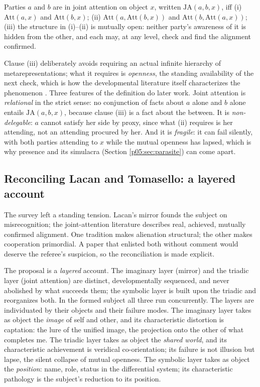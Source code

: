 \begin{defn}\label{p05:def:ja}
Parties $a$ and $b$ are in joint attention on object $x$, written $\mathrm{JA}(a,b,x)$, iff
(i) $\mathrm{Att}(a,x)$ and $\mathrm{Att}(b,x)$;
(ii) $\mathrm{Att}(a,\mathrm{Att}(b,x))$ and $\mathrm{Att}(b,\mathrm{Att}(a,x))$;
(iii) the structure in (i)--(ii) is mutually open: neither party's awareness of it is hidden from the other, and each may, at any level, check and find the alignment confirmed.
\end{defn}

Clause (iii) deliberately avoids requiring an actual infinite hierarchy of metarepresentations; what it requires is \emph{openness}, the standing availability of the next check, which is how the developmental literature itself characterizes the phenomenon \parencite{tomasello1995}. Three features of the definition do later work. Joint attention is \emph{relational} in the strict sense: no conjunction of facts about $a$ alone and $b$ alone entails $\mathrm{JA}(a,b,x)$, because clause (iii) is a fact about the between. It is \emph{non-delegable}: $a$ cannot satisfy her side by proxy, since what (ii) requires is her attending, not an attending procured by her. And it is \emph{fragile}: it can fail silently, with both parties attending to $x$ while the mutual openness has lapsed, which is why presence and its simulacra (Section \ref{p05:sec:parasite}) can come apart.

\subsection{Reconciling Lacan and Tomasello: a layered account}
\label{p05:sec:lacantomasello}

The survey left a standing tension. Lacan's mirror founds the subject on misrecognition; the joint-attention literature describes real, achieved, mutually confirmed alignment. One tradition makes alienation structural; the other makes cooperation primordial. A paper that enlisted both without comment would deserve the referee's suspicion, so the reconciliation is made explicit.

The proposal is a \emph{layered} account. The imaginary layer (mirror) and the triadic layer (joint attention) are distinct, developmentally sequenced, and never abolished by what succeeds them; the symbolic layer is built upon the triadic and reorganizes both. In the formed subject all three run concurrently. The layers are individuated by their objects and their failure modes. The imaginary layer takes as object the \emph{image} of self and other, and its characteristic distortion is captation: the lure of the unified image, the projection onto the other of what completes me. The triadic layer takes as object the \emph{shared world}, and its characteristic achievement is veridical co-orientation; its failure is not illusion but lapse, the silent collapse of mutual openness. The symbolic layer takes as object the \emph{position}: name, role, status in the differential system; its characteristic pathology is the subject's reduction to its position.

